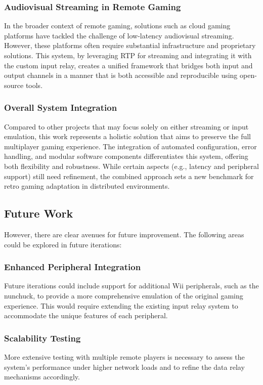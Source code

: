 \subsubsection{Audiovisual Streaming in Remote Gaming}
In the broader context of remote gaming, solutions such as cloud gaming platforms have tackled the challenge of low-latency audiovisual streaming. However, these platforms often require substantial infrastructure and proprietary solutions. This system, by leveraging RTP for streaming and integrating it with the custom input relay, creates a unified framework that bridges both input and output channels in a manner that is both accessible and reproducible using open-source tools.

\subsubsection{Overall System Integration}
Compared to other projects that may focus solely on either streaming or input emulation, this work represents a holistic solution that aims to preserve the full multiplayer gaming experience. The integration of automated configuration, error handling, and modular software components differentiates this system, offering both flexibility and robustness. While certain aspects (e.g., latency and peripheral support) still need refinement, the combined approach sets a new benchmark for retro gaming adaptation in distributed environments.


\subsection{Future Work}
However, there are clear avenues for future improvement. The following areas could be explored in future iterations:

\subsubsection{Enhanced Peripheral Integration}
Future iterations could include support for additional Wii peripherals, such as the nunchuck, to provide a more comprehensive emulation of the original gaming experience. This would require extending the existing input relay system to accommodate the unique features of each peripheral.

\subsubsection{Scalability Testing}
More extensive testing with multiple remote players is necessary to assess the system’s performance under higher network loads and to refine the data relay mechanisms accordingly.

